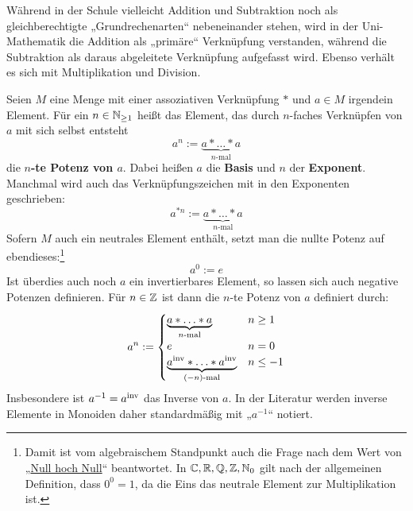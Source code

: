 \begin{bem}
    Während in der Schule vielleicht Addition und Subtraktion noch als gleichberechtigte „Grundrechenarten“ nebeneinander stehen, wird in der Uni-Mathematik die Addition als „primäre“ Verknüpfung verstanden, während die Subtraktion als daraus abgeleitete Verknüpfung aufgefasst wird. Ebenso verhält es sich mit Multiplikation und Division.
\end{bem}


\begin{de}[* Potenzen] \label{def:potenz} 
    Seien $M$ eine Menge mit einer assoziativen Verknüpfung $*$ und $a\in M$ irgendein Element. Für ein $n\in \mathbb N_{\ge 1}$ heißt das Element, das durch $n$-faches Verknüpfen von $a$ mit sich selbst entsteht
    \[ a^n := \underbrace{a * \ldots * a}_{n\text{-mal}} \]
    die \textbf{$n$-te Potenz von $a$}. Dabei heißen $a$ die \textbf{Basis} und $n$ der \textbf{Exponent}. Manchmal wird auch das Verknüpfungszeichen mit in den Exponenten geschrieben:
            \[ a^{*n} := \underbrace{a * \ldots * a}_{n\text{-mal}} \]
    Sofern $M$ auch ein neutrales Element enthält, setzt man die nullte Potenz auf ebendieses:\footnote{Damit ist vom algebraischem Standpunkt auch die Frage nach dem Wert von „\href{https://en.wikipedia.org/wiki/Zero_to_the_power_of_zero}{Null hoch Null}“ beantwortet. In $\mathbb C,\mathbb R,\mathbb Q,\mathbb Z,\mathbb N_0$ gilt nach der allgemeinen Definition, dass $0^0=1$, da die Eins das neutrale Element zur Multiplikation ist.}
        \[ a^0 := e \]
    Ist überdies auch noch $a$ ein invertierbares Element, so lassen sich auch negative Potenzen definieren. Für $n\in \mathbb Z$ ist dann die $n$-te Potenz von $a$ definiert durch:
    \begin{align*}
        a^n := \begin{cases}
            \underbrace{a* \ldots * a}_{n\text{-mal}} & n \ge 1 \\
            e & n= 0 \\
            \underbrace{a^{\mathrm{inv}} * \ldots * a^{\mathrm{inv}}}_{(-n)\text{-mal}} & n \le -1
        \end{cases}
    \end{align*}
    Insbesondere ist $a^{-1}=a^{\mathrm{inv}}$ das Inverse von $a$. In der Literatur werden inverse Elemente in Monoiden daher standardmäßig mit „$a^{-1}$“ notiert.
\end{de}

